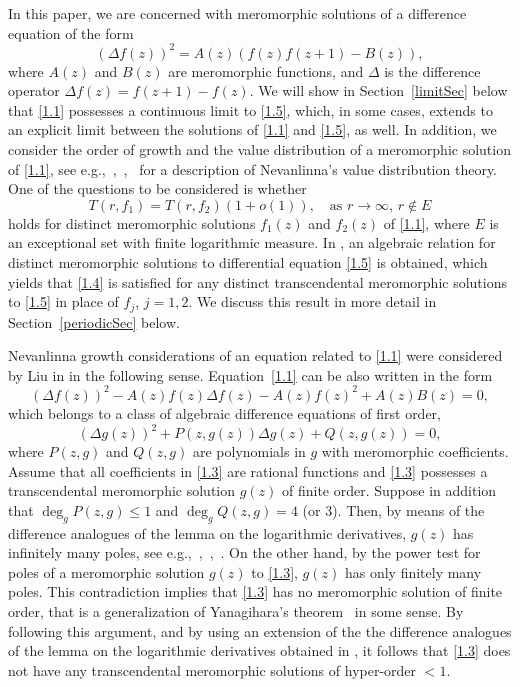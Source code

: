 \documentclass{amsart}
\begin{document}
In this paper, we are concerned with meromorphic solutions of a difference equation of the form
\begin{equation}
(\Delta f(z))^2=A(z)(f(z)f(z+1)-B(z)),\label{1.1}
\end{equation}
where $A(z)$ and $B(z)$ are meromorphic functions, and $\Delta$ is the difference operator $\Delta f(z)=f(z+1)-f(z)$. We will show in Section~\ref{limitSec} below that \eqref{1.1} possesses a continuous limit to \eqref{1.5}, which, in some cases, extends to an explicit limit between the solutions of \eqref{1.1} and \eqref{1.5}, as well. In addition, we consider the order of growth and the value distribution of a meromorphic solution of \eqref{1.1}, see e.g.,~\cite{goldbergo:08},~\cite{hayman:64},~\cite{nevanlinna:70} for a description of Nevanlinna's value distribution theory. One of the questions to be
considered is whether
\begin{equation}
T(r,f_1)=T(r,f_2)(1+o(1)), \quad \text{as $r\to \infty$, $r\not\in E$}\label{1.4}
\end{equation}
holds for distinct meromorphic solutions $f_1(z)$ and $f_2(z)$ of \eqref{1.1}, where
$E$ is an exceptional set with finite logarithmic measure.
In \cite{ishizakit:07}, an algebraic relation for distinct meromorphic solutions to differential equation \eqref{1.5} is obtained, which yields that \eqref{1.4} is satisfied for any distinct transcendental
meromorphic solutions to \eqref{1.5} in place of $f_j$, $j=1, 2$. We discuss this result in more detail in Section~\ref{periodicSec} below.

Nevanlinna growth considerations of an equation related to \eqref{1.1} were considered by Liu in \cite{liu:14} in the following sense. Equation~\eqref{1.1} can be also written in the form
\begin{equation}
(\Delta f(z))^2-A(z)f(z)\Delta f(z)-A(z)f(z)^2+A(z)B(z)=0\label{1.2},
\end{equation}
which belongs to a class of algebraic difference equations of first order,
\begin{equation}
(\Delta g(z))^2+P(z,g(z))\Delta g(z)+Q(z,g(z))=0,\label{1.3}
\end{equation}
where $P(z,g)$ and $Q(z,g)$ are polynomials in $g$ with meromorphic coefficients.
Assume that all coefficients in \eqref{1.3} are rational functions and \eqref{1.3} possesses
a transcendental meromorphic solution $g(z)$ of finite order. Suppose in addition that $\deg_gP(z,g)\leq1$ and $\deg_gQ(z,g)=4$ (or $3$). Then,
by means of the difference analogues of the lemma on the logarithmic derivatives,
$g(z)$ has infinitely many poles, see e.g.,~\cite{halburdk:06JMAA},~\cite{chiangf:08},~\cite{lainey:07}.
On the other hand, by the power test for poles of a meromorphic solution $g(z)$ to \eqref{1.3},
$g(z)$ has only finitely many poles. This contradiction implies that \eqref{1.3} has no meromorphic solution of finite order, that is a generalization of Yanagihara's theorem~\cite{yanagihara:80} in some sense. By following this argument, and by using an extension of the the difference analogues of the lemma on the logarithmic derivatives obtained in \cite{halburdkt:14TAMS}, it follows that \eqref{1.3} does not have any transcendental meromorphic solutions of hyper-order $<1$.
\end{document}
